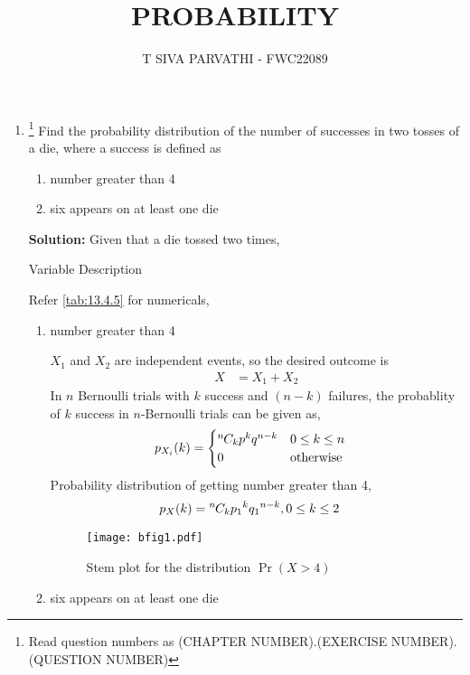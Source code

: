 \documentclass{article}
\providecommand{\pr}[1]{\ensuremath{\Pr\left(#1\right)}}
\newcommand{\solution}{\noindent \textbf{Solution: }}
\newcommand*{\permcomb}[4][0mu]{{{}^{#3}\mkern#1#2_{#4}}}
\newcommand*{\comb}[1][-1mu]{\permcomb[#1]{C}}
\providecommand{\pr}[1]{\ensuremath{\Pr\left(#1\right)}}
\begin{document}
\title{PROBABILITY}
\author{\Large T SIVA PARVATHI - FWC22089}
\date{}

\maketitle
\begin{enumerate}[label=13.\arabic{enumi}.\arabic{enumii}]%
\setcounter{enumi}{3}
\setcounter{enumii}{5}

\item \footnote{Read question numbers as (CHAPTER NUMBER).(EXERCISE NUMBER).(QUESTION NUMBER)}
Find the probability distribution of the number of successes in two tosses of a die, where a success is defined as
\begin{enumerate}
\item number greater than 4
\item six appears on at least one die
\end{enumerate}

\solution
Given that a die tossed two times,
\begin{table}[h]\centering
	
	 \caption{Variable Description}
	 \label{tab:13.4.5}
\end{table}

Refer \ref{tab:13.4.5} for numericals,
\begin{enumerate}
\item number greater than 4

$X_1$ and $X_2$ are independent events, so the desired outcome is
\begin{align}
X&=X_1+X_2
\end{align}
In $n$ Bernoulli trials with $k$ success and $(n - k)$ failures, the probablity of $k$ success in $n$-Bernoulli trials can be given as,
\begin{align}
p_{X_i}(k)   &= 
\begin{cases}
\comb{n}{k}{p}^{k}{q}^{n-k} & 0 \le k \le n\\
0 & \text{otherwise}                
\end{cases}
\end{align}
Probability distribution of getting number greater than 4,
\begin{align}
p_X(k)   &= \comb{n}{k}{p_1}^{k}{q_1}^{n-k}, 0 \le k \le 2
\end{align}

\begin{figure}
\centering
\texttt{[image: bfig1.pdf]}
\caption{Stem plot for the distribution $\pr{X>4}$}
\label{fig:Plot}
\end{figure}
\item six appears on at least one die


\end{enumerate}
\end{enumerate}
\end{document}
